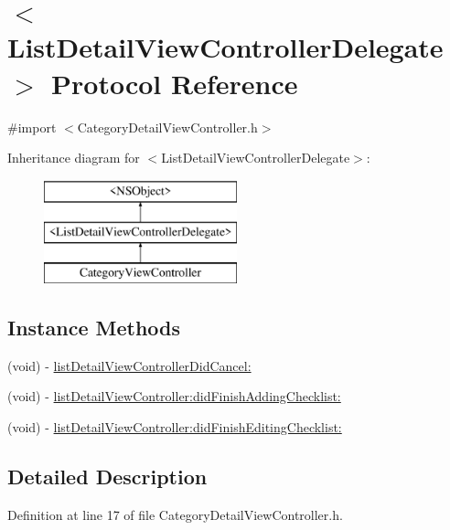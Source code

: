 \hypertarget{protocol_list_detail_view_controller_delegate-p}{\section{$<$List\-Detail\-View\-Controller\-Delegate$>$ Protocol Reference}
\label{protocol_list_detail_view_controller_delegate-p}
}


{\ttfamily \#import $<$Category\-Detail\-View\-Controller.\-h$>$}

Inheritance diagram for $<$List\-Detail\-View\-Controller\-Delegate$>$\-:\begin{figure}[H]
\begin{center}
\leavevmode
\includegraphics[height=3.000000cm]{protocol_list_detail_view_controller_delegate-p}
\end{center}
\end{figure}
\subsection*{Instance Methods}
\begin{DoxyCompactItemize}
\item 
(void) -\/ \hyperlink{protocol_list_detail_view_controller_delegate-p_a7223e10611606da74ba81348978db01d}{list\-Detail\-View\-Controller\-Did\-Cancel\-:}
\item 
(void) -\/ \hyperlink{protocol_list_detail_view_controller_delegate-p_abfb5cdc1bcedc08be115c2e8cd7a19aa}{list\-Detail\-View\-Controller\-:did\-Finish\-Adding\-Checklist\-:}
\item 
(void) -\/ \hyperlink{protocol_list_detail_view_controller_delegate-p_a61dca3ee659f85c6190f60a224b1ce02}{list\-Detail\-View\-Controller\-:did\-Finish\-Editing\-Checklist\-:}
\end{DoxyCompactItemize}


\subsection{Detailed Description}


Definition at line 17 of file Category\-Detail\-View\-Controller.\-h.



